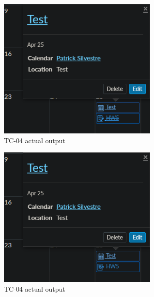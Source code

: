 \documentclass[10pt,letterpaper]{article}
\begin{document}
\begin{figure}[h]
	\centerline{\includegraphics[width=8cm]{screenshots/tc04-actual-output.png}}
	\caption{TC-04 actual output}
\end{figure}
\begin{figure}[h]
	\centerline{\includegraphics[width=8cm]{screenshots/tc04-actual-output.png}}
	\caption{TC-04 actual output}
\end{figure}
\end{document}
